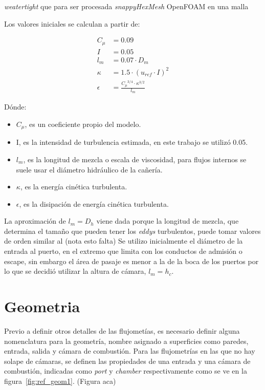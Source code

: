 \emph{weatertight} que para ser procesada \emph{snappyHexMesh} OpenFOAM en una
malla

Los valores iniciales se calculan a partir de:

\begin{align}
  C_{\mu} &= 0.09 \\
  I &= 0.05 \\
  l_{m} &= 0.07 \cdot D_{m} \\
  \kappa &= 1.5 \cdot {\left( u_{ref} \cdot I \right)}^{2}\\
  \epsilon &= \frac{{C_{\mu}}^{3/4} \cdot {\kappa}^{3/2}} {l_{m}}
\end{align}

Dónde:
%
\begin{itemize}
    \item $C_{\mu}$, es un coeficiente propio del modelo.
    \item I, es la intensidad de turbulencia estimada, en este trabajo se utilizó 0.05.
    \item $l_m$, es la longitud de mezcla o escala de viscosidad,
     para flujos internos se suele usar el diámetro hidráulico de la cañería.
    \item $\kappa$, es la energía cinética turbulenta.
    \item $\epsilon$, es la disipación de energía cinética turbulenta.
\end{itemize}

La aproximación de $l_m = D_h$ viene dada porque la longitud de mezcla, que
determina el tamaño que pueden tener los \emph{eddys} turbulentos, puede tomar
valores de orden similar al (nota esto falta)
%
Se utilizo inicialmente el diámetro de la entrada al puerto, en el extremo que
limita con los conductos de admisión o escape, sin embargo el área de pasaje es
menor a la de la boca de los puertos por lo que se decidió utilizar la altura de
cámara, $l_m = h_c$.



\section{Geometria}
Previo a definir otros detalles de las flujometías, es necesario definir alguna
nomenclatura para la geometría, nombre asignado a superficies como paredes,
entrada, salida y cámara de combustión.
%
Para las flujometrías en las que no hay solape de cámaras, se definen las
propiedades de una entrada y una cámara de combustión, indicadas como
\emph{port} y \emph{chamber} respectivamente como se ve en la figura~\ref{fig:ref_geom1}.
%
(Figura aca)

